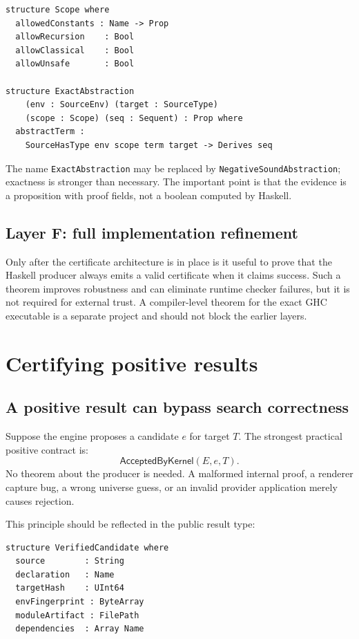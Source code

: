 \documentclass[11pt,letterpaper,openany]{report}
\theoremstyle{definition}
\theoremstyle{remark}
\newcommand{\code}[1]{\texttt{#1}}
\begin{document}
\begin{lstlisting}[language=LeanFour,caption={One-way adequacy, sufficient for negative results.}]
structure Scope where
  allowedConstants : Name -> Prop
  allowRecursion    : Bool
  allowClassical    : Bool
  allowUnsafe       : Bool

structure ExactAbstraction
    (env : SourceEnv) (target : SourceType)
    (scope : Scope) (seq : Sequent) : Prop where
  abstractTerm :
    SourceHasType env scope term target -> Derives seq
\end{lstlisting}

The name \code{ExactAbstraction} may be replaced by \code{NegativeSoundAbstraction}; exactness is stronger than necessary. The important point is that the evidence is a proposition with proof fields, not a boolean computed by Haskell.

\section{Layer F: full implementation refinement}

Only after the certificate architecture is in place is it useful to prove that the Haskell producer always emits a valid certificate when it claims success. Such a theorem improves robustness and can eliminate runtime checker failures, but it is not required for external trust. A compiler-level theorem for the exact GHC executable is a separate project and should not block the earlier layers.

\chapter{Certifying positive results}
\label{ch:positive}

\section{A positive result can bypass search correctness}

Suppose the engine proposes a candidate \(e\) for target \(T\). The strongest practical positive contract is:
\[
  \mathsf{AcceptedByKernel}(E,e,T).
\]
No theorem about the producer is needed. A malformed internal proof, a renderer capture bug, a wrong universe guess, or an invalid provider application merely causes rejection.

This principle should be reflected in the public result type:

\begin{lstlisting}[language=LeanFour,caption={A proof-carrying positive result.}]
structure VerifiedCandidate where
  source        : String
  declaration   : Name
  targetHash    : UInt64
  envFingerprint : ByteArray
  moduleArtifact : FilePath
  dependencies  : Array Name
\end{lstlisting}
\end{document}
